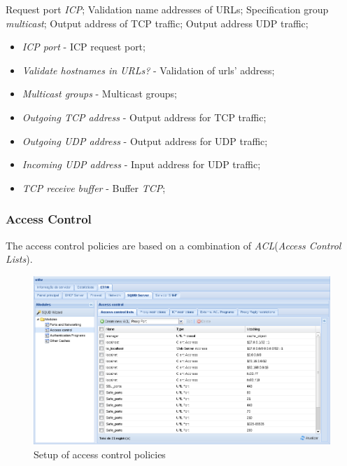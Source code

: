 Request port \textit{ICP};
Validation name addresses of URLs;
Specification group \textit{multicast};
Output address of TCP traffic;
Output address UDP traffic;


\begin{itemize}
    \item \textit{ICP port} - ICP request port;
    \item \textit{Validate hostnames in URLs?} - Validation of urls' address;
    \item \textit{Multicast groups} - Multicast groups;
    \item \textit{Outgoing TCP address} - Output address for TCP traffic;
    \item \textit{Outgoing UDP address} - Output address for UDP traffic;
    \item \textit{Incoming UDP address} - Input address for UDP traffic;
    \item \textit{TCP receive buffer} - Buffer \textit{TCP};
\end{itemize}

\subsubsection{Access Control}

The access control policies are based on a combination of \textit{ACL}(\textit{Access Control Lists}).

\begin{figure}[H]
    \begin{center}
    \includegraphics[scale=0.38]{screenshots/etfw/etfw_squid_accesscontrol_01.png}
    \caption{Setup of access control policies}
    \label{fig:etfw_squid_accesscontrol_01}
    \end{center}
\end{figure}

